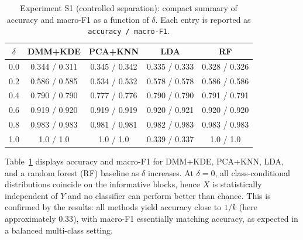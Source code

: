 \documentclass[preprint,11pt]{elsarticle}
\begin{document}
\begin{table}[H]
\centering
\caption{Experiment S1 (controlled separation): compact summary of accuracy and macro-F1 as a function of $\delta$.
Each entry is reported as \texttt{accuracy / macro-F1}.}
\label{tab:s1_results_compact}
\setlength{\tabcolsep}{6pt}
\renewcommand{\arraystretch}{1.12}
\begin{tabular}{c c c c c}
\toprule
$\delta$ & DMM+KDE & PCA+KNN & LDA & RF \\
\midrule
0.0 & 0.344 / 0.311 & 0.345 / 0.342 & 0.335 / 0.333 & 0.328 / 0.326 \\
0.2 & 0.586 / 0.585 & 0.534 / 0.532 & 0.578 / 0.578 & 0.586 / 0.586 \\
0.4 & 0.790 / 0.790 & 0.777 / 0.776 & 0.790 / 0.790 & 0.791 / 0.791 \\
0.6 & 0.919 / 0.920 & 0.919 / 0.919 & 0.920 / 0.921 & 0.920 / 0.920 \\
0.8 & 0.983 / 0.983 & 0.981 / 0.981 & 0.982 / 0.983 & 0.983 / 0.983 \\
1.0 & 1.0 / 1.0 & 1.0 / 1.0 & 0.339 / 0.337 & 1.0 / 1.0 \\
\bottomrule
\end{tabular}
\end{table}

Table~\ref{tab:s1_results_compact} displays accuracy and macro-F1 for DMM+KDE, PCA+KNN, LDA, and a random forest (RF)
baseline as $\delta$ increases.
At $\delta=0$, all class-conditional distributions coincide on the informative blocks, hence $X$ is statistically independent of $Y$ and
no classifier can perform better than chance. This is confirmed by the results: all methods yield accuracy close to $1/k$ (here approximately
$0.33$), with macro-F1 essentially matching accuracy, as expected in a balanced multi-class setting.
\end{document}
